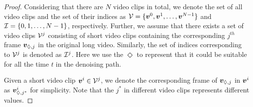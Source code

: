 \documentclass{article}
\newtheorem{proof}{Proof}[section]
\begin{document}
\begin{proof}
Considering that there are $N$ video clips in total, we denote the set of all video clips and the set of their indices as ${\mathcal{V}}=\{{\bm{v}}^{0},{\bm{v}}^{1}, \dots, {\bm{v}}^{N-1}\}$ and ${\mathcal{I}} = \{0,1,\dots,N-1\}$, respectively. Further, we assume that there exists a set of video clips ${\mathcal{V}}^j$ consisting of short video clips containing the corresponding $j^{th}$ frame ${\bm{v}}_{\Diamond,j}$ in the original long video. Similarly, the set of indices corresponding to ${\mathcal{V}}^{j}$ is denoted as ${\mathcal{I}}^j$. Here we use the $\Diamond$ to represent that it could be suitable for all the time $t$ in the denoising path.  

Given a short video clip ${\bm{v}}^i \in {\mathcal{V}}^j$, we denote the corresponding frame of ${\bm{v}}_{\Diamond,j}$ in ${\bm{v}}^i$  as ${\bm{v}}^i_{\Diamond,j^*}$  for simplicity. Note that the $j^*$ in different video clips represents different values. 


\end{proof}
\end{document}
